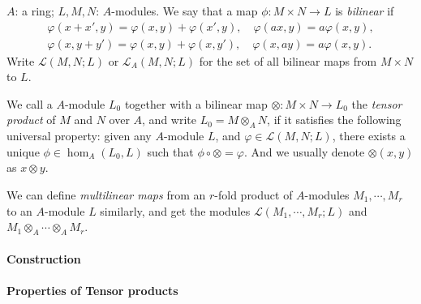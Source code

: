 \( A \): a ring; \( L, M, N \): \( A \)-modules.
We say that a map \( \phi: M \times N \to L \) is \emph{bilinear} if
\begin{align*}
  \varphi(x + x', y) = \varphi(x, y) + \varphi(x', y), \quad \varphi(ax, y) = a \varphi (x, y),\\
  \varphi(x, y + y') = \varphi(x, y) + \varphi(x, y'), \quad \varphi(x, ay) = a \varphi (x, y).
\end{align*}
Write \( \mathscr{L}(M, N; L) \) or \( \mathscr{L}_A(M, N; L) \) for the set of all bilinear maps from \( M \times N \) to \( L \).

We call a \( A \)-module \( L_0 \) together with a bilinear map \( \otimes: M \times N \to L_0 \) the \emph{tensor product} of \( M \) and \( N \) over \( A \), and write \( L_0 = M \otimes_A N \), if it satisfies the following universal property:
given any \( A \)-module \( L \), and \( \varphi \in \mathscr{L}(M, N; L) \), there exists a unique \( \phi \in \hom_A(L_0, L) \) such that \( \phi \circ \otimes = \varphi \).
And we usually denote \( \otimes(x, y) \) as \( x \otimes y \).
\begin{center}
\end{center}
We can define \emph{multilinear maps} from an \( r \)-fold product of \( A \)-modules \( M_1, \cdots, M_r \) to an \( A \)-module \( L \) similarly, and get the modules \( \mathscr{L}(M_1, \cdots, M_r; L) \) and \( M_1 \otimes_A \cdots \otimes_A M_r \).

\paragraph{Construction}

\paragraph{Properties of Tensor products}

